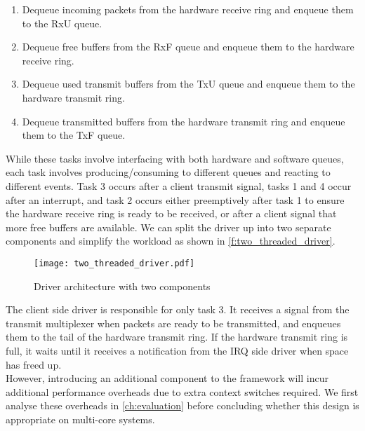 \begin{enumerate}
    \item Dequeue incoming packets from the hardware receive ring and enqueue them to the RxU queue.
    \item Dequeue free buffers from the RxF queue and enqueue them to the hardware receive ring.
    \item Dequeue used transmit buffers from the TxU queue and enqueue them to the hardware transmit ring.
    \item Dequeue transmitted buffers from the hardware transmit ring and enqueue them to the TxF queue. 
\end{enumerate}

While these tasks involve interfacing with both hardware and software queues, each task involves
producing/consuming to different queues and reacting to different events. Task 3 occurs after a client transmit signal, 
tasks 1 and 4 occur after an interrupt, and task 2 occurs either preemptively after task 1 to ensure the hardware receive
ring is ready to be received, or after a client signal that more free buffers are available. We can split the driver up into
two separate components and simplify the workload as shown in \autoref{f:two_threaded_driver}.

\begin{figure}[h]
    \centering
    \texttt{[image: two\_threaded\_driver.pdf]}
    \caption{Driver architecture with two components}
    \label{f:two_threaded_driver}
\end{figure}

The client side driver is responsible for only task 3. It receives a signal from the transmit multiplexer when packets are ready
to be transmitted, and enqueues them to the tail of the hardware transmit ring. If the hardware transmit ring is full, it waits 
until it receives a notification from the IRQ side driver when space has freed up.\\
However, introducing an additional component to the framework will incur additional performance overheads due to extra context switches required.
We first analyse these overheads in \autoref{ch:evaluation} before concluding whether this design is appropriate on multi-core systems. 

